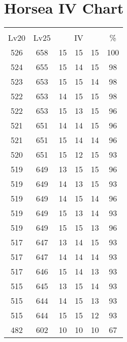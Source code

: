\documentclass{article}%
\begin{document}
%
\normalsize%
\section{Horsea IV Chart}%
\label{sec:Horsea IV Chart}%
\renewcommand{\arraystretch}{1.5}%
\begin{tabular}{|c|c|c|c|c|c|}%
\hline%
\multicolumn{6}{|c|}{\textcolor{white}{ 
\linebreak{Horsea}
}%
\cellcolor{black}}\\%
\multicolumn{1}{|c}{Lv20}&\multicolumn{1}{c|}{Lv25}&\multicolumn{3}{c|}{IV}&\multicolumn{1}{|c|}{\%}\\%
\hline%
\rowcolor{color100}%
526&658&15&15&15&100\\%
\hline%
\rowcolor{color98}%
524&655&15&14&15&98\\%
\hline%
\rowcolor{color98}%
523&653&15&15&14&98\\%
\hline%
\rowcolor{color98}%
522&653&14&15&15&98\\%
\hline%
\rowcolor{color96}%
522&653&15&13&15&96\\%
\hline%
\rowcolor{color96}%
521&651&14&14&15&96\\%
\hline%
\rowcolor{color96}%
521&651&15&14&14&96\\%
\hline%
\rowcolor{color93}%
520&651&15&12&15&93\\%
\hline%
\rowcolor{color96}%
519&649&13&15&15&96\\%
\hline%
\rowcolor{color93}%
519&649&14&13&15&93\\%
\hline%
\rowcolor{color96}%
519&649&14&15&14&96\\%
\hline%
\rowcolor{color93}%
519&649&15&13&14&93\\%
\hline%
\rowcolor{color96}%
519&649&15&15&13&96\\%
\hline%
\rowcolor{color93}%
517&647&13&14&15&93\\%
\hline%
\rowcolor{color93}%
517&647&14&14&14&93\\%
\hline%
\rowcolor{color93}%
517&646&15&14&13&93\\%
\hline%
\rowcolor{color93}%
515&645&13&15&14&93\\%
\hline%
\rowcolor{color93}%
515&644&14&15&13&93\\%
\hline%
\rowcolor{color93}%
515&644&15&15&12&93\\%
\hline%
\rowcolor{color91}%
482&602&10&10&10&67\\%
\end{tabular}

%
\end{document}
